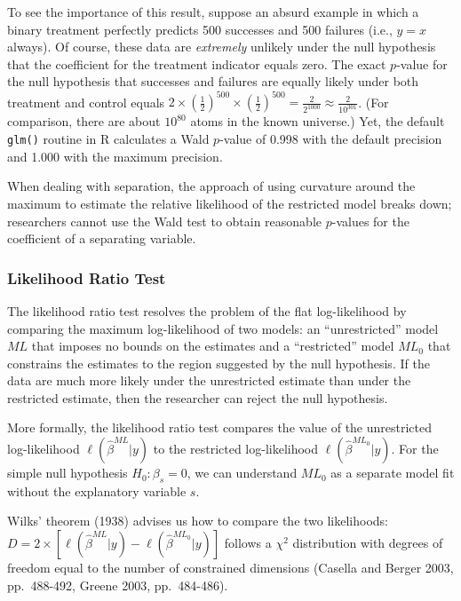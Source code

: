\documentclass[
]{article}
\begin{document}
To see the importance of this result, suppose an absurd example in which
a binary treatment perfectly predicts 500 successes and 500 failures
(i.e., \(y = x\) always). Of course, these data are \emph{extremely}
unlikely under the null hypothesis that the coefficient for the
treatment indicator equals zero. The exact \(p\)-value for the null
hypothesis that successes and failures are equally likely under both
treatment and control equals
\(2 \times \left( \frac{1}{2} \right)^{500} \times \left( \frac{1}{2} \right)^{500} = \frac{2}{2^{1000}} \approx \frac{2}{10^{301}}\).
(For comparison, there are about \(10^{80}\) atoms in the known
universe.) Yet, the default \texttt{glm()} routine in R calculates a
Wald \(p\)-value of 0.998 with the default precision and 1.000 with the
maximum precision.

When dealing with separation, the approach of using curvature around the
maximum to estimate the relative likelihood of the restricted model
breaks down; researchers cannot use the Wald test to obtain reasonable
\(p\)-values for the coefficient of a separating variable.

\hypertarget{likelihood-ratio-test}{%
\subsubsection{Likelihood Ratio Test}\label{likelihood-ratio-test}}

The likelihood ratio test resolves the problem of the flat
log-likelihood by comparing the maximum log-likelihood of two models: an
``unrestricted'' model \(ML\) that imposes no bounds on the estimates
and a ``restricted'' model \(ML_0\) that constrains the estimates to the
region suggested by the null hypothesis. If the data are much more
likely under the unrestricted estimate than under the restricted
estimate, then the researcher can reject the null hypothesis.

More formally, the likelihood ratio test compares the value of the
unrestricted log-likelihood \(\ell(\hat{\beta}^{ML} | y)\) to the
restricted log-likelihood \(\ell(\hat{\beta}^{ML_0} | y)\). For the
simple null hypothesis \(H_0: \beta_s = 0\), we can understand \(ML_0\)
as a separate model fit without the explanatory variable \(s\).

Wilks' theorem (1938) advises us how to compare the two likelihoods:
\(D = 2 \times \left[ \ell(\hat{\beta}^{ML} | y) - \ell(\hat{\beta}^{ML_0} | y) \right]\)
follows a \(\chi^2\) distribution with degrees of freedom equal to the
number of constrained dimensions (Casella and Berger 2003, pp.~488-492,
Greene 2003, pp.~484-486).
\end{document}
